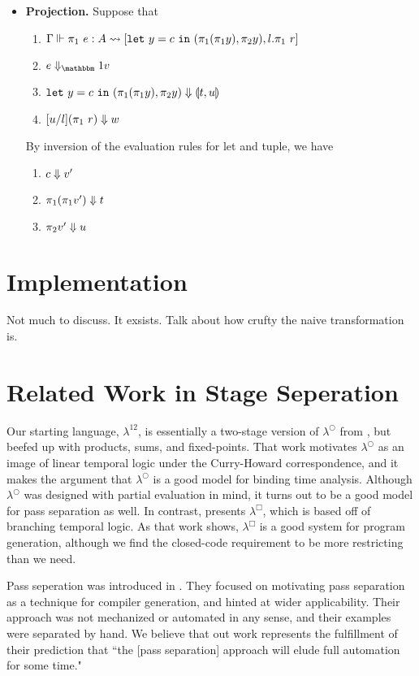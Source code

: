 \documentclass{article}
\begin{document}
\begin{itemize}
\item {\bf Projection.} Suppose that
\begin{enumerate}
\item ${\Gamma} \Vdash {\pi_1~e}:{A} \rightsquigarrow \left[{{\tt let}~{y} = {c}~{\tt in}~{(\pi_1(\pi_1 y),\pi_2 y)},l.\pi_1~r}\right]$
\item $\reduceone{e}{v}$
\item ${{\tt let}~{y} = {c}~{\tt in}~{(\pi_1(\pi_1 y),\pi_2 y)}} \Downarrow {\llparenthesis{t},{u}\rrparenthesis}$
\item ${[u/l](\pi_1~r)} \Downarrow {w}$
\end{enumerate}
By inversion of the evaluation rules for let and tuple, we have
\begin{enumerate}
\item ${c} \Downarrow {v'}$
\item ${\pi_1(\pi_1v')} \Downarrow {t}$
\item ${\pi_2 v'} \Downarrow {u}$
\end{enumerate}

\end{itemize}

\section {Implementation}

Not much to discuss.  It exsists.  Talk about how crufty the naive transformation is.

\section{Related Work in Stage Seperation}

Our starting language, $\lambda^{12}$, is essentially a two-stage version of $\lambda^\bigcirc$ from \cite{davies96}, but beefed up with products, sums, and fixed-points.  That work motivates $\lambda^\bigcirc$ as an image of linear temporal logic under the Curry-Howard correspondence, and it makes the argument that $\lambda^\bigcirc$ is a good model for binding time analysis.  Although $\lambda^\bigcirc$ was designed with partial evaluation in mind, it turns out to be a good model for pass separation as well.  In contrast, \cite{davies01} presents $\lambda^\Box$, which is based off of branching temporal logic.  As that work shows, $\lambda^\Box$ is a good system for program generation, although we find the closed-code requirement to be more restricting than we need.

Pass seperation was introduced in \cite{jorring}.  They focused on motivating pass separation as a technique for compiler generation, and hinted at wider applicability.  Their approach was not mechanized or automated in any sense, and their examples were separated by hand.  We believe that out work represents the fulfillment of their prediction that ``the [pass separation] approach will elude full automation for some time."
\end{document}
